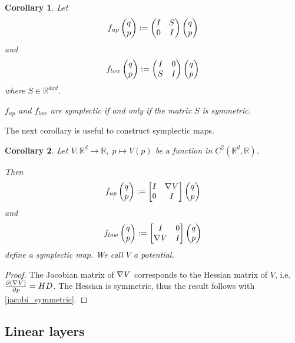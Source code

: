 \documentclass[twoside,a4paper]{article}
\newtheorem{corollary}{Corollary}
\begin{document}
\begin{corollary}\label{matrix_symmetric}
	Let
	\begin{equation*}
		f_{up} \begin{pmatrix} q \\ p \end{pmatrix} := \begin{pmatrix}
			I & S \\
			0 & I
		\end{pmatrix} \begin{pmatrix} q \\ p \end{pmatrix}
	\end{equation*}
	and
	\begin{equation*}
		f_{low} \begin{pmatrix} q \\ p \end{pmatrix} := \begin{pmatrix}
			I & 0 \\
			S & I
		\end{pmatrix} \begin{pmatrix} q \\ p \end{pmatrix}
	\end{equation*}
	where $S \in \mathbb{R}^{dxd}$. 

	$f_{up}$ and $f_{low}$ are symplectic if and only if the matrix $S$
	is symmetric.
\end{corollary}

The next corollary is useful to construct symplectic maps.
\begin{corollary}\label{gradient_corollary}
	Let $V: \mathbb{R}^d \to \mathbb{R}, \; p \mapsto V(p)$ be a function in 
	$C^2(\mathbb{R}^d, \mathbb{R})$. 
	
	Then
	\begin{equation*}
		f_{up} \begin{pmatrix} q \\ p \end{pmatrix} := \begin{bmatrix} I & {\nabla_{}{V}} \\ 0 & I \end{bmatrix} \begin{pmatrix} q \\ p \end{pmatrix}
	\end{equation*}
	and
	\begin{equation*}
		f_{low} \begin{pmatrix} q \\ p \end{pmatrix} := \begin{bmatrix} I & 0 \\ {\nabla_{}{V}} & I \end{bmatrix} \begin{pmatrix} q \\ p \end{pmatrix}
	\end{equation*}
	define a symplectic map. We call $V$ a potential.
\end{corollary}
\begin{proof}
	The Jacobian matrix of $\nabla_{}{V}$ corresponds to the Hessian matrix of $V$,
	i.e. $\frac{\partial (\nabla_{}{V})}{\partial p} = HD$. 
	The Hessian is symmetric, thus the result follows with \cref{jacobi_symmetric}.
\end{proof}


\subsection{Linear layers}
\end{document}
